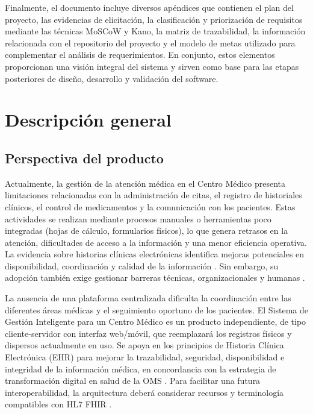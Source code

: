 \documentclass[11pt,a4paper]{article}
\begin{document}
	Finalmente, el documento incluye diversos apéndices que contienen el plan del proyecto, las evidencias de elicitación, la clasificación y priorización de requisitos mediante las técnicas MoSCoW y Kano, la matriz de trazabilidad, la información relacionada con el repositorio del proyecto y el modelo de metas utilizado para complementar el análisis de requerimientos. En conjunto, estos elementos proporcionan una visión integral del sistema y sirven como base para las etapas posteriores de diseño, desarrollo y validación del software.
	
	
	
	\section{ Descripción general}
	
	\subsection{ Perspectiva del producto}
	
	Actualmente, la gestión de la atención médica en el Centro Médico presenta limitaciones relacionadas con la administración de citas, el registro de historiales clínicos, el control de medicamentos y la comunicación con los pacientes. Estas actividades se realizan mediante procesos manuales o herramientas poco integradas (hojas de cálculo, formularios físicos), lo que genera retrasos en la atención, dificultades de acceso a la información y una menor eficiencia operativa. La evidencia sobre historias clínicas electrónicas identifica mejoras potenciales en disponibilidad, coordinación y calidad de la información \cite{hayrinen2008,menachemi2011,buntin2011,campanella2016}. Sin embargo, su adopción también exige gestionar barreras técnicas, organizacionales y humanas \cite{kruse2016,gagnon2012,carayon2014}.
	
	La ausencia de una plataforma centralizada dificulta la coordinación entre las diferentes áreas médicas y el seguimiento oportuno de los pacientes. El Sistema de Gestión Inteligente para un Centro Médico es un producto independiente, de tipo cliente-servidor con interfaz web/móvil, que reemplazará los registros físicos y dispersos actualmente en uso. Se apoya en los principios de Historia Clínica Electrónica (EHR) para mejorar la trazabilidad, seguridad, disponibilidad e integridad de la información médica, en concordancia con la estrategia de transformación digital en salud de la OMS \cite{who2021strategy}. Para facilitar una futura interoperabilidad, la arquitectura deberá considerar recursos y terminología compatibles con HL7 FHIR \cite{hl7fhir}.
	
\end{document}
